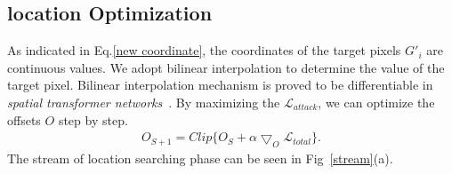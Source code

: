 \documentclass[10pt,twocolumn,letterpaper]{article}
\begin{document}
\subsection{location Optimization}
As indicated in Eq.\ref{new coordinate},
the coordinates of the target pixels $G'_i$ are continuous values. 
We adopt bilinear interpolation to determine the value of 
the target pixel. 
Bilinear interpolation mechanism is proved 
to be differentiable in 
\textit{spatial transformer networks}~\cite{stn}.
By maximizing the $\mathcal{L}_{attack}$, 
we can optimize the offsets $O$ step by step.
\begin{align}
	O_{S+1} = Clip 
	\{O_{S} + \alpha 
	{\bigtriangledown_{O}\mathcal{L}_{total}}\}. 
\end{align}
The stream of location searching phase can be seen in 
Fig~\ref{stream}(a). 
\end{document}
